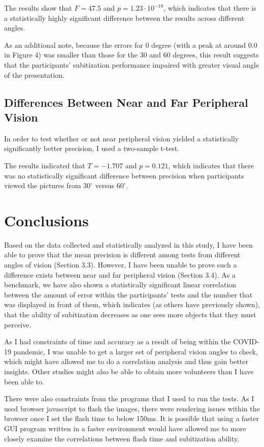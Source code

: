 \documentclass[12pt]{article}
\begin{document}
The results show that $F=47.5$ and $p = 1.23 \cdot 10^{-18}$, which indicates
that there is a statistically highly significant difference between the results
across different angles.

As an additional note, because the errors for 0 degree (with a peak at around
$0.0$ in Figure 4) was smaller than those for the 30 and 60 degrees,
this result suggests that the participants’ subitization performance
impaired with greater visual angle of the presentation.

\subsection{Differences Between Near and Far Peripheral Vision}

In order to test whether or not near peripheral vision yielded a statistically
significantly better precision, I used a two-sample t-test.

The results indicated that $T = -1.707$ and $p = 0.121$, which indicates that
there was no statistically significant difference between precision when
participants viewed the pictures from $30^{\circ}$ versus $60^{\circ}$.

\section{Conclusions}
Based on the data collected and statistically analyzed in this study, I have
been able to prove that the mean precision is different among tests from
different angles of vision (Section 3.3).  However, I have been unable to prove
such a difference exists between near and far peripheral vision (Section 3.4).
As a benchmark, we have also shown a statistically significant linear
correlation between the amount of error within the participants' tests and the
number that was displayed in front of them, which indicates (as others have
previously shown), that the ability of subitization decreases as one
sees more objects that they must perceive.

As I had constraints of time and accuracy as a result of being within the
COVID-19 pandemic, I was unable to get a larger set of peripheral vision angles
to check, which might have allowed me to do a correlation analysis and thus
gain better insights. Other studies might also be able to obtain more
volunteers than I have been able to.

There were also constraints from the programs that I used to run the tests. As
I used browser javascript to flash the images, there were rendering issues
within the browser once I set the flash time to below 150ms. It is possible
that using a faster GUI program written in a faster environment would have
allowed me to more closely examine the correlations between flash time and
subitization ability.

\printbibliography
\end{document}
